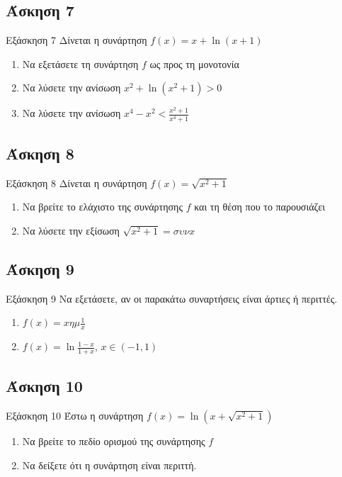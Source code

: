 \documentclass[greek]{beamer}
\begin{document}
\subsection{Άσκηση 7}
\begin{frame}[label=Άσκηση7,t]{Εξάσκηση 7}
      Δίνεται η συνάρτηση $f(x)=x+\ln (x+1)$
      \begin{enumerate}
            \item Να εξετάσετε τη συνάρτηση $f$ ως προς τη μονοτονία \pause
            \item Να λύσετε την ανίσωση $x^2+\ln (x^2+1)>0$ \pause
            \item Να λύσετε την ανίσωση $x^4-x^2<\frac{x^2+1}{x^4+1}$
      \end{enumerate}
\end{frame}

\subsection{Άσκηση 8}
\begin{frame}[label=Άσκηση8,t]{Εξάσκηση 8}
      Δίνεται η συνάρτηση $f(x)=\sqrt{x^2+1}$
      \begin{enumerate}
            \item Να βρείτε το ελάχιστο της συνάρτησης $f$ και τη θέση που το παρουσιάζει \pause
            \item Να λύσετε την εξίσωση $\sqrt{x^2+1}=συν x$
      \end{enumerate}
\end{frame}

\subsection{Άσκηση 9}
\begin{frame}[label=Άσκηση9,t]{Εξάσκηση 9}
      Να εξετάσετε, αν οι παρακάτω συναρτήσεις είναι άρτιες ή περιττές.
      \begin{enumerate}
            \item $f(x)=x ημ \frac{1}{x}$ \pause
            \item $f(x)=\ln \frac{1-x}{1+x}$,  $x\in (-1,1)$
      \end{enumerate}
\end{frame}

\subsection{Άσκηση 10}
\begin{frame}[label=Άσκηση10,t]{Εξάσκηση 10}
      Έστω η συνάρτηση $f(x)=\ln (x+\sqrt{x^2+1})$
      \begin{enumerate}
            \item Να βρείτε το πεδίο ορισμού της συνάρτησης $f$ \pause
            \item Να δείξετε ότι η συνάρτηση είναι περιττή.
      \end{enumerate}
\end{frame}
\end{document}
